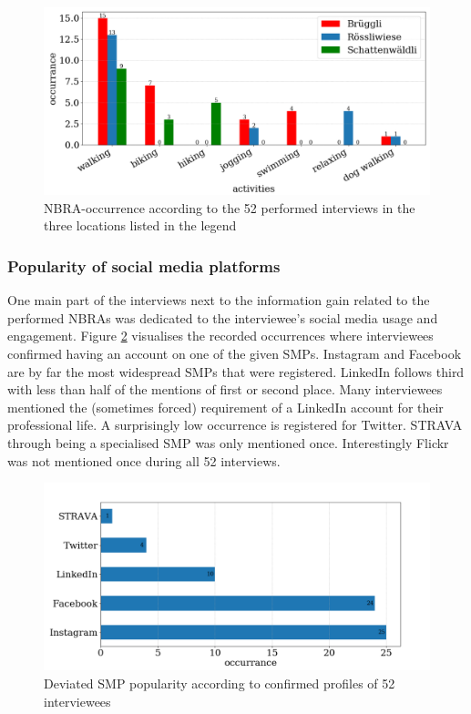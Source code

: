 \begin{figure}[h!]
   \centering
   \includegraphics[width=\textwidth]{img/interview_activities.pdf}
   \caption{NBRA-occurrence according to the 52 performed interviews in the three locations listed in the legend}
   \label{fig:interview_activities}
\end{figure}

\subsubsection*{Popularity of social media platforms }
One main part of the interviews next to the information gain related to the performed NBRAs was dedicated to the interviewee's social media usage and engagement. Figure \ref{fig:interview_SMP} visualises the recorded occurrences where interviewees confirmed having an account on one of the given SMPs. Instagram and Facebook are by far the most widespread SMPs that were registered. LinkedIn follows third with less than half of the mentions of first or second place. Many interviewees mentioned the (sometimes forced) requirement of a LinkedIn account for their professional life. A surprisingly low occurrence is registered for Twitter. STRAVA through being a specialised SMP was only mentioned once. Interestingly Flickr was not mentioned once during all 52 interviews.

\begin{figure}[h!]
   \centering
   \includegraphics[width=\textwidth]{img/interview_socialmedia_bigger_font.pdf}
   \caption{Deviated SMP popularity according to confirmed profiles of 52 interviewees}
   \label{fig:interview_SMP}
\end{figure}

